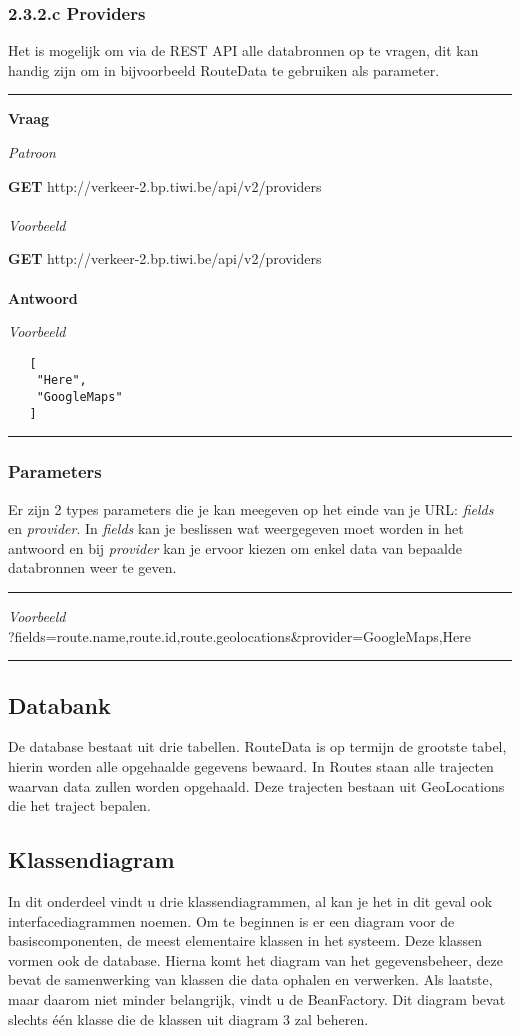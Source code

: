\documentclass[ps,a4paper,oneside]{report}
\begin{document}
\subsubsection{2.3.2.c Providers}
Het is mogelijk om via de REST API alle databronnen op te vragen, dit kan handig zijn om in bijvoorbeeld RouteData te gebruiken als parameter.\\
\noindent\rule[0.5ex]{\linewidth}{1pt}
\textbf{Vraag}

\textit{Patroon}

\textbf{GET} http://verkeer-2.bp.tiwi.be/api/v2/providers\\\\

\textit{Voorbeeld}

\textbf{GET} http://verkeer-2.bp.tiwi.be/api/v2/providers\\\\
\textbf{Antwoord}

\textit{Voorbeeld}
\begin{verbatim}
   [
    "Here",
    "GoogleMaps"
   ]
\end{verbatim}
\noindent\rule[0.5ex]{\linewidth}{1pt}
\subsubsection{Parameters}
Er zijn 2 types parameters die je kan meegeven op het einde van je URL: \textit{fields} en \textit{provider}. In \textit{fields} kan je beslissen wat weergegeven moet worden in het antwoord en bij \textit{provider} kan je ervoor kiezen om enkel data van bepaalde databronnen weer te geven.\\
\noindent\rule[0.5ex]{\linewidth}{1pt}
\textit{Voorbeeld}\\
?fields=route.name,route.id,route.geolocations\&provider=GoogleMaps,Here\\
\noindent\rule[0.5ex]{\linewidth}{1pt}
\clearpage
\subsection{Databank}
De database bestaat uit drie tabellen. RouteData is op termijn de grootste tabel, hierin worden alle opgehaalde gegevens bewaard. In Routes staan alle trajecten waarvan data zullen worden opgehaald. Deze trajecten bestaan uit GeoLocations die het traject bepalen.
\subsection{Klassendiagram}
In dit onderdeel vindt u drie klassendiagrammen, al kan je het in dit geval ook interfacediagrammen noemen. Om te beginnen is er een diagram voor de basiscomponenten, de meest elementaire klassen in het systeem. Deze klassen vormen ook de database. Hierna komt het diagram van het gegevensbeheer, deze bevat de samenwerking van klassen die data ophalen en verwerken. Als laatste, maar daarom niet minder belangrijk, vindt u de BeanFactory. Dit diagram bevat slechts \'e\'en klasse die de klassen uit diagram 3 zal beheren.
\end{document}

